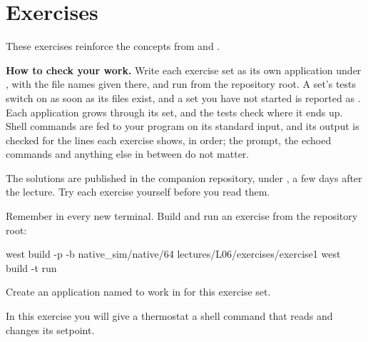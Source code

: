 
\section{Exercises}
\label{c6:sec:exercises}\label{c6:app:c}
These exercises reinforce the concepts from  and .

\begin{aside}
\textbf{How to check your work.} Write each exercise set as its own application under
, with the file names given there, and run  from the
repository root. A set’s tests switch on as soon as its files exist, and a set you have not started
is reported as . Each application grows through its set, and the tests check where it
ends up. Shell commands are fed to your program on its standard input, and its output is checked for
the lines each exercise shows, in order; the prompt, the echoed commands and anything else in
between do not matter.

The solutions are published in the companion repository, under
, a few days after the lecture. Try each exercise yourself
before you read them.
\end{aside}

Remember  in every new terminal. Build and run an exercise from the repository
root:

\begin{shell}
west build -p -b native_sim/native/64 lectures/L06/exercises/exercise1
west build -t run
\end{shell}

\label{c6:set:1}
Create an application named  to work in for this exercise set.

\label{c6:ex:1.1}
In this exercise you will give a thermostat a shell command that reads and changes its setpoint.

